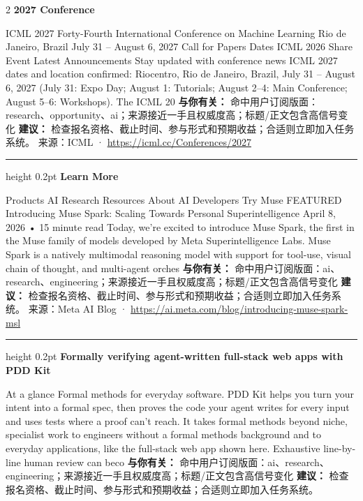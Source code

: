 \documentclass[10.5pt]{ctexart}
\begin{document}
\begin{multicols}{2}
{\large\bfseries 2027 Conference}\par
ICML 2027 Forty-Fourth International Conference on Machine Learning Rio de Janeiro, Brazil July 31 – August 6, 2027 Call for Papers Dates ICML 2026 Share Event Latest Announcements Stay updated with conference news ICML 2027 dates and location confirmed: Riocentro, Rio de Janeiro, Brazil, July 31 – August 6, 2027 (July 31: Expo Day; August 1: Tutorials; August 2–4: Main Conference; August 5–6: Workshops). The ICML 20
\textbf{与你有关：} 命中用户订阅版面：research、opportunity、ai；来源接近一手且权威度高；标题/正文包含高信号变化
\textbf{建议：} 检查报名资格、截止时间、参与形式和预期收益；合适则立即加入任务系统。
{\footnotesize\color{ormuted} 来源：ICML · \url{https://icml.cc/Conferences/2027}}
\vspace{2mm}
\hrule height 0.2pt
\vspace{2mm}
{\large\bfseries Learn More}\par
Products AI Research Resources About AI Developers Try Muse FEATURED Introducing Muse Spark: Scaling Towards Personal Superintelligence April 8, 2026 • 15 minute read Today, we’re excited to introduce Muse Spark, the first in the Muse family of models developed by Meta Superintelligence Labs. Muse Spark is a natively multimodal reasoning model with support for tool-use, visual chain of thought, and multi-agent orches
\textbf{与你有关：} 命中用户订阅版面：ai、research、engineering；来源接近一手且权威度高；标题/正文包含高信号变化
\textbf{建议：} 检查报名资格、截止时间、参与形式和预期收益；合适则立即加入任务系统。
{\footnotesize\color{ormuted} 来源：Meta AI Blog · \url{https://ai.meta.com/blog/introducing-muse-spark-msl}}
\vspace{2mm}
\hrule height 0.2pt
\vspace{2mm}
{\large\bfseries Formally verifying agent-written full-stack web apps with PDD Kit}\par
At a glance Formal methods for everyday software. PDD Kit helps you turn your intent into a formal spec, then proves the code your agent writes for every input and uses tests where a proof can’t reach. It takes formal methods beyond niche, specialist work to engineers without a formal methods background and to everyday applications, like the full-stack web app shown here. Exhaustive line-by-line human review can beco
\textbf{与你有关：} 命中用户订阅版面：ai、research、engineering；来源接近一手且权威度高；标题/正文包含高信号变化
\textbf{建议：} 检查报名资格、截止时间、参与形式和预期收益；合适则立即加入任务系统。

\end{multicols}
\end{document}
